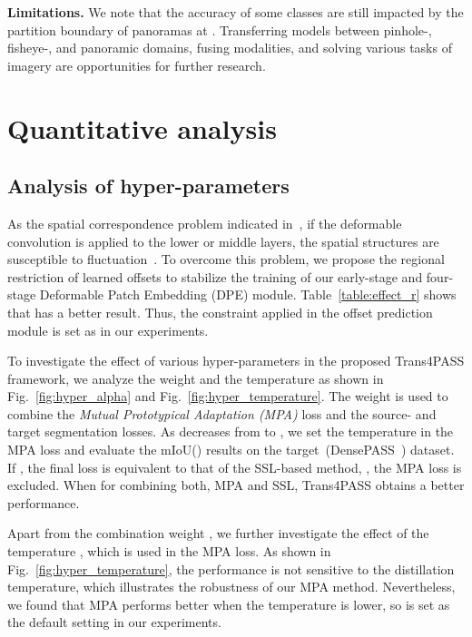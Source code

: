 \documentclass[final]{cvpr}
\begin{document}
\noindent\textbf{Limitations.} We note that the accuracy of some classes are still impacted by the partition boundary of panoramas at . Transferring models between pinhole-, fisheye-, and panoramic domains, fusing modalities, and solving various tasks of  imagery are opportunities for further research.

\clearpage

{\small


}

\newpage
\appendix

\section{Quantitative analysis}

\subsection{Analysis of hyper-parameters}
As the spatial correspondence problem indicated in~\cite{dai2017deformable}, if the deformable convolution is applied to the lower or middle layers, the spatial structures are susceptible to fluctuation~\cite{restricted}. To overcome this problem, we propose the regional restriction of learned offsets to stabilize the training of our early-stage and four-stage Deformable Patch Embedding (DPE) module. Table~\ref{table:effect_r} shows that  has a better result. Thus, the constraint  applied in the offset prediction module is set as  in our experiments. 

To investigate the effect of various hyper-parameters in the proposed Trans4PASS framework, we analyze the weight  and the temperature  as shown in Fig.~\ref{fig:hyper_alpha} and Fig.~\ref{fig:hyper_temperature}. The weight  is used to combine the \emph{Mutual Prototypical Adaptation (MPA)} loss and the source- and target segmentation losses. As  decreases from  to , we set the temperature  in the MPA loss and evaluate the mIoU() results on the target~(DensePASS~\cite{densepass}) dataset. If , the final loss is equivalent to that of the SSL-based method, \ie, the MPA loss is excluded. When  for combining both, MPA and SSL, Trans4PASS obtains a better performance. 

Apart from the combination weight , we further investigate the effect of the temperature , which is used in the MPA loss. As shown in Fig.~\ref{fig:hyper_temperature}, the performance is not sensitive to the distillation temperature, which illustrates the robustness of our MPA method. Nevertheless, we found that MPA performs better when the temperature is lower, so  is set as the default setting in our experiments.
\end{document}

